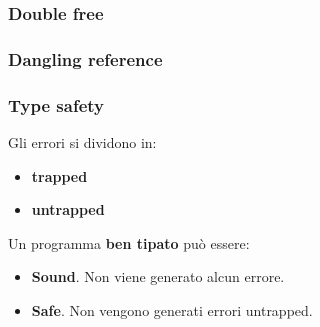 \documentclass{beamer}
\begin{document}


\begin{frame}
    \frametitle{Double free}
    
\end{frame}

    

\begin{frame}
    \frametitle{Dangling reference}
    
    
\end{frame}

\begin{frame}
    \frametitle{Type safety}
    Gli errori si dividono in:
    \begin{itemize}
        \item \textbf{trapped}
        \item \textbf{untrapped}
    \end{itemize}
    Un programma \textbf{ben tipato} può essere:
    \begin{itemize}
        \item \textbf{Sound}. Non viene generato alcun errore.
        \item \textbf{Safe}. Non vengono generati errori untrapped.
    \end{itemize}
\end{frame}

\end{document}
